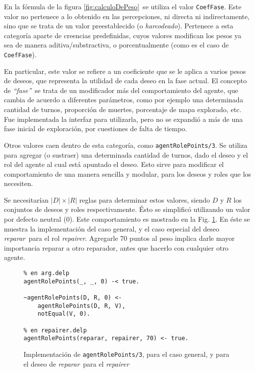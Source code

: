 \documentclass[oneside]{book}
\begin{document}
En la fórmula de la figura \ref{fig:calculoDePeso}\ se utiliza el valor 
\texttt{CoefFase}. Este valor no pertenece a lo obtenido en las percepciones, ni
directa ni indirectamente, sino que se trata de un valor preestablecido (o
\textit{harcodeado}). Pertenece a esta categoría aparte de creencias predefinidas,
cuyos valores modifican los pesos ya sea de manera aditiva/substractiva, o 
porcentualmente (como es el caso de \texttt{CoefFase}).

En particular, este valor se refiere a un coeficiente que se le aplica a varios
pesos de deseos, que representa la utilidad de cada deseo en la fase actual. El 
concepto de \textit{``fase''}\ se trata de un modificador más del comportamiento
del agente, que cambia de acuerdo a diferentes parámetros, como por ejemplo una
determinada cantidad de turnos, proporción de muertes, porcentaje de mapa explorado,
etc. Fue implementada la interfaz para utilizarla, pero no se expandió a más de una
fase inicial de exploración, por cuestiones de falta de tiempo.

Otros valores caen dentro de esta categoría, como \texttt{agentRolePoints/3}.
Se utiliza para agregar (o sustraer) una determinada cantidad de turnos, dado el
deseo y el rol del agente al cual está apuntado el deseo. Esto sirve para modificar el 
comportamiento de una manera sencilla y modular, para los deseos y roles que los 
necesiten.

Se necesitarían $|D| \times |R|$ reglas para determinar estos valores, siendo $D$
y $R$ los conjuntos de deseos y roles respectivamente. Ésto se simplificó utilizando
un valor por defecto neutral ($0$). Este comportamiento es mostrado
en la Fig. \ref{fig:agentRolePoints}. En éste se muestra la implementación del caso
general, y el caso especial del deseo \emph{reparar}\ para el rol \emph{repairer}.
Agregarle 70 puntos al peso implica darle mayor importancia reparar a otro reparador,
antes que hacerlo con cualquier otro agente.

\begin{figure}
\begin{verbatim}
% en arg.delp
agentRolePoints(_, _, 0) -< true.
	
~agentRolePoints(D, R, 0) <- 
	agentRolePoints(D, R, V),
	notEqual(V, 0).
    
% en repairer.delp
agentRolePoints(reparar, repairer, 70) <- true.
\end{verbatim}
\caption{Implementación de \texttt{agentRolePoints/3}, para el caso general, y para el 
deseo de \emph{reparar}\ para el \emph{repairer}}
\label{fig:agentRolePoints}
\end{figure}
\end{document}
